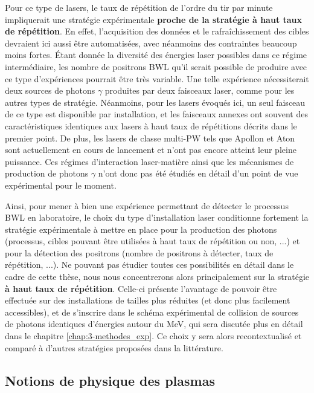 \begin{refsection}
\begin{enumerate}
    Pour ce type de lasers, le taux de répétition de l'ordre du tir par minute impliquerait une stratégie expérimentale \textbf{proche de la stratégie à haut taux de répétition}. En effet, l'acquisition des données et le rafraîchissement des cibles devraient ici aussi être automatisées, avec néanmoins des contraintes beaucoup moins fortes. Étant donnée la diversité des énergies laser possibles dans ce régime intermédiaire, les nombre de positrons BWL qu'il serait possible de produire avec ce type d'expériences pourrait être très variable. Une telle expérience nécessiterait deux sources de photons $\gamma$ produites par deux faisceaux laser, comme pour les autres types de stratégie. Néanmoins, pour les lasers évoqués ici, un seul faisceau de ce type est disponible par installation, et les faisceaux annexes ont souvent des caractéristiques identiques aux lasers à haut taux de répétitions décrits dans le premier point. De plus, les lasers de classe multi-PW tels que Apollon et Aton sont actuellement en cours de lancement et n'ont pas encore atteint leur pleine puissance. Ces régimes d'interaction laser-matière ainsi que les mécanismes de production de photons $\gamma$ n'ont donc pas été étudiés en détail d'un point de vue expérimental pour le moment. 
\end{enumerate}

Ainsi, pour mener à bien une expérience permettant de détecter le processus BWL en laboratoire, le choix du type d'installation laser conditionne fortement la stratégie expérimentale à mettre en place pour la production des photons (processus, cibles pouvant être utilisées à haut taux de répétition ou non, ...) et pour la détection des positrons (nombre de positrons à détecter, taux de répétition, ...). Ne pouvant pas étudier toutes ces possibilités en détail dans le cadre de cette thèse, nous nous concentrerons alors principalement sur la stratégie \textbf{à haut taux de répétition}. Celle-ci présente l'avantage de pouvoir être effectuée sur des installations de tailles plus réduites (et donc plus facilement accessibles), et de s'inscrire dans le schéma expérimental de collision de sources de photons identiques d'énergies autour du MeV, qui sera discutée plus en détail dans le chapitre \ref{chap:3-methodes_exp}. Ce choix y sera alors recontextualisé et comparé à d'autres stratégies proposées dans la littérature.

\subsection{Notions de physique des plasmas}


\end{refsection}
